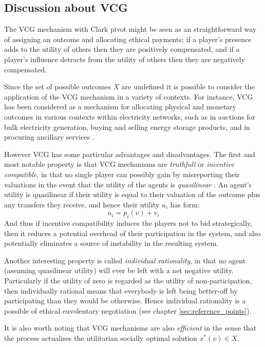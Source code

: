 \subsection{Discussion about VCG}
The VCG mechanism with Clark pivot might be seen as an straightforward way of assigning an outcome and allocating ethical payments; if a player's presence adds to the utility of others then they are positively compensated, and if a player's influence detracts from the utility of others then they are negatively compensated.

Since the set of possible outcomes $X$ are undefined it is possible to consider the application of the VCG mechanism in a variety of contexts.	
For instance, VCG has been considered as a mechanism for allocating physical and monetary outcomes in various contexts within electricity networks, such as in auctions for bulk electricity generation, buying and selling energy storage products, and in procuring ancillary services \cite{FABRA200272, SESSA2017189, 8264596, 7512339}.

However VCG has some particular advantages and disadvantages.
The first and most notable property is that VCG mechanisms are \textit{truthfull} or \textit{incentive compatible}, in that no single player can possibly gain by misreporting their valuations in the event that the utility of the agents is \textit{quasilinear} \cite{roberts1979characterization, Lavi2008}.
An agent's utility is quasilinear if their utility is equal to their valuation of the outcome plus any transfers they receive, and hence their utility $u_i$ has form:
$$ u_i = p_i(v)+v_i $$
And thus if incentive compatibility induces the players not to bid strategically, then it reduces a potential overhead of their participation in the system, and also potentially eliminates a source of instability in the resulting system.

Another interesting property is called \textit{individual rationality}, in that no agent (assuming quasilinear utility) will ever be left with a net negative utility. Particularly if the utility of zero is regarded as the utility of non-participation, then individually rational means that everybody is left being better-off by participating than they would be otherwise. Hence individual rationality is a possible of ethical euvolentary negotiation (see chapter \ref{sec:reference_points}).

It is also worth noting that VCG mechanisms are also \textit{efficient} in the sense that the process actualises the utilitarian socially optimal solution $x^*(v) \in X$.

